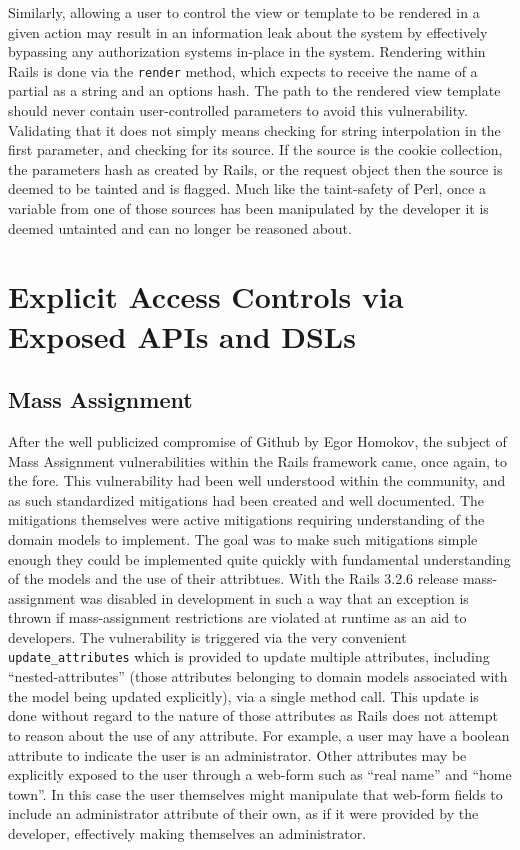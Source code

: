\documentclass[conference]{IEEEtran}
\begin{document}
Similarly, allowing a user to control the view or template to be rendered in a given
action may result in an information leak about the system by effectively bypassing any
authorization systems in-place in the system.  Rendering within Rails is done via the
\texttt{render}\cite{render_method} method, which expects to receive the name of a partial
as a string and an options hash.  The path to the rendered view template should never
contain user-controlled parameters to avoid this vulnerability.  Validating that it does
not simply means checking for string interpolation in the first parameter, and checking
for its source.  If the source is the cookie collection, the parameters hash as created by
Rails, or the request object then the source is deemed to be tainted and is flagged.  Much
like the taint-safety of Perl, once a variable from one of those sources has been
manipulated by the developer it is deemed untainted and can no longer be reasoned about.

\section{Explicit Access Controls via Exposed APIs and DSLs}

\subsection{Mass Assignment}

After the well publicized compromise of Github by Egor Homokov\cite{egor}, the subject of
Mass Assignment vulnerabilities within the Rails framework came, once again, to the fore.
This vulnerability had been well understood within the community, and as such standardized
mitigations had been created and well documented.  The mitigations themselves were active
mitigations requiring understanding of the domain models to implement.  The goal was to
make such mitigations simple enough they could be implemented quite quickly with
fundamental understanding of the models and the use of their attribtues.  With the Rails
3.2.6 release mass-assignment was disabled in development in such a way that an exception
is thrown if mass-assignment restrictions are violated at runtime as an aid to developers.
The vulnerability is triggered via the very convenient \texttt{update\_attributes} which
is provided to update multiple attributes, including ``nested-attributes'' (those
attributes belonging to domain models associated with the model being updated explicitly),
via a single method call.  This update is done without regard to the nature of those
attributes as Rails does not attempt to reason about the use of any attribute.  For
example, a user may have a boolean attribute to indicate the user is an administrator.
Other attributes may be explicitly exposed to the user through a web-form such as ``real
name'' and ``home town''. In this case the user themselves might manipulate that web-form
fields to include an administrator attribute of their own, as if it were provided by the
developer, effectively making themselves an administrator.
\end{document}
